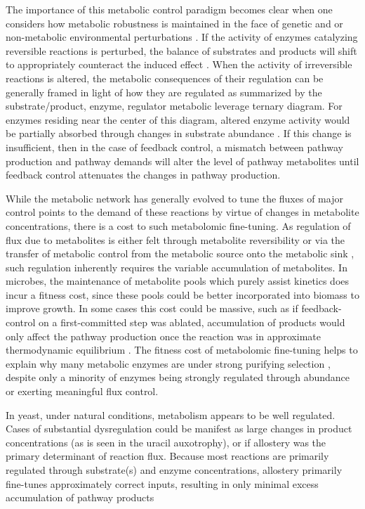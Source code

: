 The importance of this metabolic control paradigm becomes clear when one considers how metabolic robustness is maintained in the face of genetic and or non-metabolic environmental perturbations \cite{Larhlimi:2011ds}. If the activity of enzymes catalyzing reversible reactions is perturbed, the balance of substrates and products will shift to appropriately counteract the induced effect \cite{Fendt:2010gr}. When the activity of irreversible reactions is altered, the metabolic consequences of their regulation can be generally framed in light of how they are regulated as summarized by the substrate/product, enzyme, regulator metabolic leverage ternary diagram. For enzymes residing near the center of this diagram, altered enzyme activity would be partially absorbed through changes in substrate abundance \cite{Fendt:2010gr}. If this change is insufficient, then in the case of feedback control, a mismatch between pathway production and pathway demands will alter the level of pathway metabolites until feedback control attenuates the changes in pathway production.

While the metabolic network has generally evolved to tune the fluxes of major control points to the demand of these reactions by virtue of changes in metabolite concentrations, there is a cost to such metabolomic fine-tuning.  As regulation of flux due to metabolites is either felt through metabolite reversibility or via the transfer of metabolic control from the metabolic source onto the metabolic sink \cite{Fell:1997wg}, such regulation inherently requires the variable accumulation of metabolites. In microbes, the maintenance of metabolite pools which purely assist kinetics does incur a fitness cost, since these pools could be better incorporated into biomass to improve growth. In some cases this cost could be massive, such as if feedback-control on a first-committed step was ablated, accumulation of products would only affect the pathway production once the reaction was in approximate thermodynamic equilibrium \cite{CornishBowden:1995fy}. The fitness cost of metabolomic fine-tuning helps to explain why many metabolic enzymes are under strong purifying selection \cite{Greenberg:2008uy}, despite only a minority of enzymes being strongly regulated through abundance or exerting meaningful flux control.

In yeast, under natural conditions, metabolism appears to be well regulated. Cases of substantial dysregulation could be manifest as large changes in product concentrations (as is seen in the uracil auxotrophy), or if allostery was the primary determinant of reaction flux. Because most reactions are primarily regulated through substrate(s) and enzyme concentrations, allostery primarily fine-tunes approximately correct inputs, resulting in only minimal excess accumulation of pathway products

